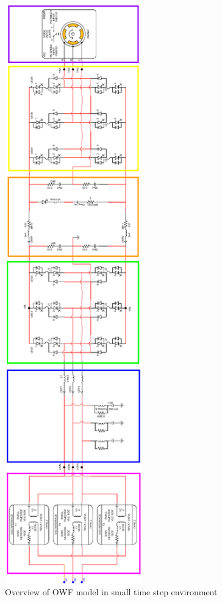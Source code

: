 \begin{figure}[H]
    \includegraphics[height = 25cm,width = 6cm]{Diagrams/Chapter_3/SmallTimeStep_WTModel_New3.pdf}
    \caption{Overview of OWF model in small time step environment}
    \label{fig:OveriewSmallTimeStepOWF}
\end{figure}


